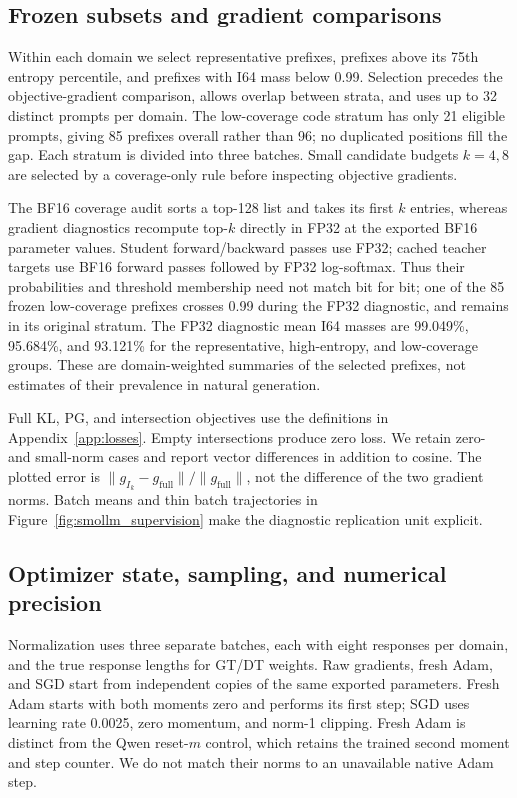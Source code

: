 

\subsection{Frozen subsets and gradient comparisons}

Within each domain we select representative prefixes, prefixes above its 75th entropy percentile, and prefixes with I64 mass below 0.99. Selection precedes the objective-gradient comparison, allows overlap between strata, and uses up to 32 distinct prompts per domain. The low-coverage code stratum has only 21 eligible prompts, giving 85 prefixes overall rather than 96; no duplicated positions fill the gap. Each stratum is divided into three batches. Small candidate budgets $k=4,8$ are selected by a coverage-only rule before inspecting objective gradients.

The BF16 coverage audit sorts a top-128 list and takes its first $k$ entries, whereas gradient diagnostics recompute top-$k$ directly in FP32 at the exported BF16 parameter values. Student forward/backward passes use FP32; cached teacher targets use BF16 forward passes followed by FP32 log-softmax. Thus their probabilities and threshold membership need not match bit for bit; one of the 85 frozen low-coverage prefixes crosses 0.99 during the FP32 diagnostic, and remains in its original stratum. The FP32 diagnostic mean I64 masses are 99.049\%, 95.684\%, and 93.121\% for the representative, high-entropy, and low-coverage groups. These are domain-weighted summaries of the selected prefixes, not estimates of their prevalence in natural generation.

Full KL, PG, and intersection objectives use the definitions in Appendix~\ref{app:losses}. Empty intersections produce zero loss. We retain zero- and small-norm cases and report vector differences in addition to cosine. The plotted error is $\|g_{I_k}-g_{\mathrm{full}}\|/\|g_{\mathrm{full}}\|$, not the difference of the two gradient norms. Batch means and thin batch trajectories in Figure~\ref{fig:smollm_supervision} make the diagnostic replication unit explicit.

\subsection{Optimizer state, sampling, and numerical precision}
\label{app:smollm_controls}

Normalization uses three separate batches, each with eight responses per domain, and the true response lengths for GT/DT weights. Raw gradients, fresh Adam, and SGD start from independent copies of the same exported parameters. Fresh Adam starts with both moments zero and performs its first step; SGD uses learning rate 0.0025, zero momentum, and norm-1 clipping. Fresh Adam is distinct from the Qwen reset-$m$ control, which retains the trained second moment and step counter. We do not match their norms to an unavailable native Adam step.


